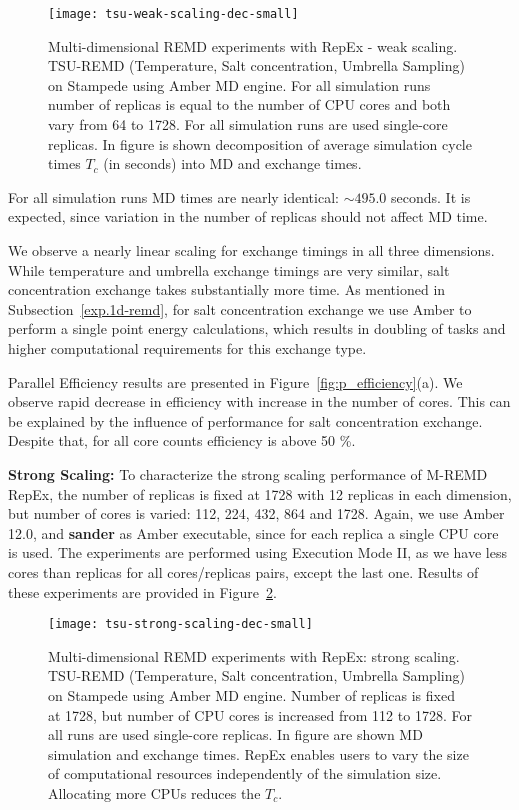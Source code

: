 \documentclass{sig-alternate-05-2015}
\begin{document}
\begin{figure}[ht!]  \centering \texttt{[image: tsu-weak-scaling-dec-small]} \caption{\small{Multi-dimensional REMD experiments with RepEx - weak scaling. TSU-REMD (Temperature, Salt concentration, Umbrella Sampling) on Stampede using Amber MD engine. For all simulation runs number of replicas is equal to the number of CPU cores and both vary from 64 to 1728. For all simulation runs are used single-core replicas. In figure is shown decomposition of average simulation cycle times $T_{c}$ (in seconds) into MD and exchange times.} }
\label{fig:tsu_weak} 
\end{figure}

For all simulation runs MD times are nearly identical: $\sim 495.0$ seconds. It is expected, since variation in the number of replicas should not affect MD time. 
 
We observe a nearly linear scaling for exchange timings in all three dimensions. While temperature and umbrella exchange timings are very similar, salt concentration exchange takes substantially more time. As mentioned in Subsection~\ref{exp.1d-remd}, for salt concentration exchange we use Amber to perform a single point energy calculations, which results in doubling of tasks and higher computational requirements for this exchange type.

Parallel Efficiency results are presented in Figure~\ref{fig:p_efficiency}(a). We observe rapid decrease in efficiency with increase in the number of cores. This can be explained by the influence of performance for salt concentration exchange. Despite that, for all core counts efficiency is above 50 \%.

{\bf Strong Scaling:}  To characterize the strong scaling performance of M-REMD RepEx, the number of replicas is fixed at 1728 with 12 replicas in each dimension, but number of cores is varied: 112, 224, 432, 864 and 1728. Again, we use Amber 12.0, and \textbf{sander} as Amber executable, since for each replica a single CPU core is used.  The experiments are performed using Execution Mode II, as we have less cores than replicas for all cores/replicas pairs, except the last one. Results of these experiments are provided in Figure~\ref{fig:tsu_strong}.

\begin{figure}[ht!]
\centering
\texttt{[image: tsu-strong-scaling-dec-small]}
\caption{\small{Multi-dimensional REMD experiments with RepEx: strong scaling. TSU-REMD (Temperature, Salt concentration, Umbrella Sampling) on Stampede using Amber MD engine. Number of replicas is fixed at 1728, but number of CPU cores is increased from 112 to 1728. For all runs are used single-core replicas. In figure are shown MD simulation and exchange times. RepEx enables users to vary the size of computational resources independently of the simulation size. Allocating more CPUs reduces the $T_{c}$.}    
}
\label{fig:tsu_strong}
\end{figure}
\end{document}
